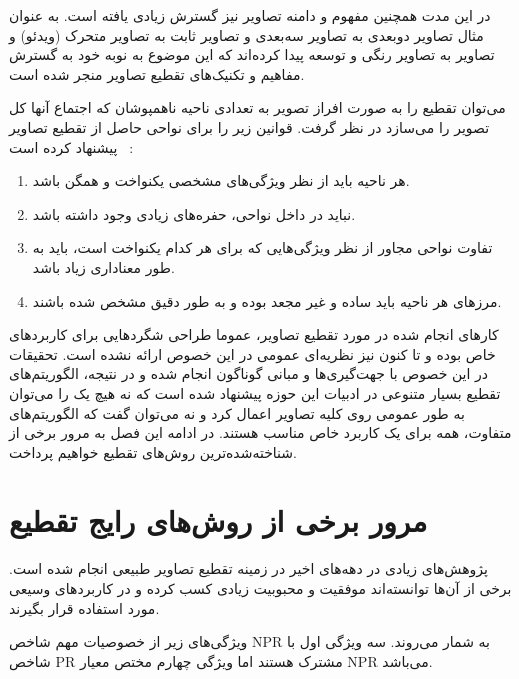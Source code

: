 در این مدت همچنین مفهوم و دامنه تصاویر نیز گسترش زیادی یافته است.
به عنوان مثال تصاویر دوبعدی به تصاویر سه‌بعدی و تصاویر ثابت به تصاویر متحرک (ویدئو) و تصاویر
{}
به تصاویر رنگی و
{}
توسعه پیدا کرده‌اند
که این موضوع به نوبه خود به گسترش مفاهیم و تکنیک‌های تقطیع تصاویر منجر شده است.

می‌توان تقطیع را به صورت افراز تصویر به تعدادی ناحیه ناهمپوشان که اجتماع آنها کل تصویر را می‌سازد در نظر گرفت.
قوانین زیر را برای نواحی حاصل از تقطیع تصاویر پیشنهاد کرده است%
~\cite{haralick_image_1985}:

\begin{enumerate}
	\item
	هر ناحیه باید از نظر ویژگی‌های مشخصی یکنواخت و همگن باشد.
	\item
	نباید در داخل نواحی، حفره‌های زیادی وجود داشته باشد.
	\item
	تفاوت نواحی مجاور از نظر ویژگی‌هایی که برای هر کدام یکنواخت است، باید به طور معناداری زیاد باشد.
	\item
	مرزهای هر ناحیه باید ساده و غیر مجعد بوده و به طور دقیق مشخص شده باشند.
\end{enumerate}

کارهای انجام شده در مورد تقطیع تصاویر، عموما طراحی شگردهایی برای کاربردهای خاص بوده و تا کنون نیز نظریه‌ای عمومی در این خصوص ارائه نشده است.
تحقیقات در این خصوص با جهت‌گیری‌ها و مبانی گوناگون  انجام شده و در نتیجه، الگوریتم‌های تقطیع بسیار متنوعی در ادبیات این حوزه پیشنهاد شده است
که نه هیچ یک را می‌توان به طور عمومی روی کلیه تصاویر اعمال کرد و نه می‌توان گفت که الگوریتم‌های متفاوت، همه برای یک کاربرد خاص مناسب هستند.
در ادامه این فصل به مرور برخی از شناخته‌شده‌ترین روش‌های تقطیع خواهیم پرداخت.


\section{مرور برخی از روش‌های رایج تقطیع}
پژوهش‌های زیادی در دهه‌های اخیر در زمینه تقطیع تصاویر طبیعی انجام شده است.
برخی از آن‌ها توانسته‌اند موفقیت و محبوبیت زیادی کسب کرده و در کاربردهای وسیعی مورد استفاده قرار بگیرند.

ویژگی‌های زیر از خصوصیات مهم شاخص NPR به شمار می‌روند. سه ویژگی اول با شاخص PR مشترک هستند اما ویژگی چهارم مختص معیار NPR می‌باشد.

